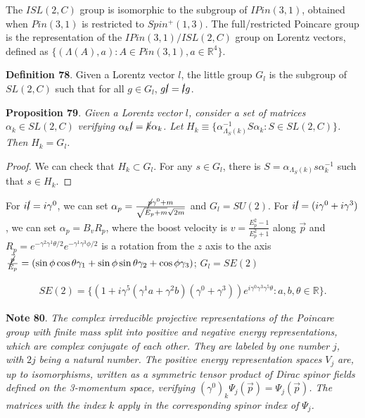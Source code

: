 \documentclass[11pt]{book}
\begin{document}
The \(ISL(2,C)\) group is isomorphic to the subgroup of \(IPin(3,1)\),
obtained when \(Pin(3,1)\) is restricted to \(Spin^+(1,3)\). The
full/restricted Poincare group is the representation of the
\(IPin(3,1)/ISL(2,C)\) group on Lorentz vectors, defined as
\(\{(\Lambda(A),a): A\in Pin(3,1), a\in \mathbb{R}^4\}\).

\textbf{Definition 78}. Given a Lorentz vector \(l\), the little group
\(G_l\) is the subgroup of \(SL(2,C)\) such that for all \(g\in G_l\),
\(g\cancel l=\cancel l g\).

\textbf{Proposition 79}. \emph{Given a Lorentz vector }\(l\)\emph{,
consider a set of matrices }\(\alpha_k\in
SL(2,C)\)\emph{ verifying
}\(\alpha_k \cancel l=\cancel k \alpha_k\)\emph{. Let
}\(H_k \equiv \{\alpha_{\Lambda_S(k)}^{-1} S\alpha_k: S\in SL(2,C)\}\)\emph{.
Then }\(H_k=G_l\)\emph{.}

\emph{Proof.} We can check that \(H_k\subset G_l\). For any
\(s\in G_l\), there is \(S=\alpha_{\Lambda_S(k)} s \alpha_k^{-1}\) such
that \(s\in H_k\).~◻

For \(i\cancel l=i\gamma^0\), we can set
\(\alpha_p=\frac{\cancel p\gamma^0+m}{\sqrt{E_p+m}\sqrt{2m}}\) and
\(G_l=SU(2)\). For \(i\cancel l=(i\gamma^0+i\gamma^3)\), we can set
\(\alpha_p=B_vR_{p}\), where the boost velocity is
\(v=\frac{E_p^2-1}{E_p^2+1}\) along \(\vec{p}\) and
\(R_p=e^{-\gamma^2\gamma^1 \theta/2}e^{-\gamma^1\gamma^3 \phi/2}\) is a
rotation from the \(z\) axis to the axis
\(\frac{\vec{\cancel p}}{E_p}=(\sin\phi \cos\theta \gamma_1+\sin\phi \sin\theta
\gamma_2+\cos\phi \gamma_3)\); \(G_l=SE(2)\)

\begin{equation}\begin{aligned}
SE(2)=\{(1+i\gamma^5(\gamma^1a+\gamma^2b)(\gamma^0+\gamma^3))e^{i\gamma^0\gamma^3\gamma^5\theta}:
a,b,\theta\in \mathbb{R}\}.\end{aligned}\end{equation}

\textbf{Note 80}. \emph{The complex irreducible projective
representations of the Poincare group with finite mass split into
positive and negative energy representations, which are complex
conjugate of each other. They are labeled by one number }\(j\)\emph{,
with }\(2j\)\emph{ being a natural number. The positive energy
representation spaces }\(V_j\)\emph{ are, up to isomorphisms, written as
a symmetric tensor product of Dirac spinor fields defined on the
3-momentum space, verifying
}\((\gamma^0)_k\Psi_j(\vec{p})=\Psi_j(\vec{p})\)\emph{. The matrices
with the index }\(k\)\emph{ apply in the corresponding spinor index of
}\(\Psi_j\)\emph{.}
\end{document}
